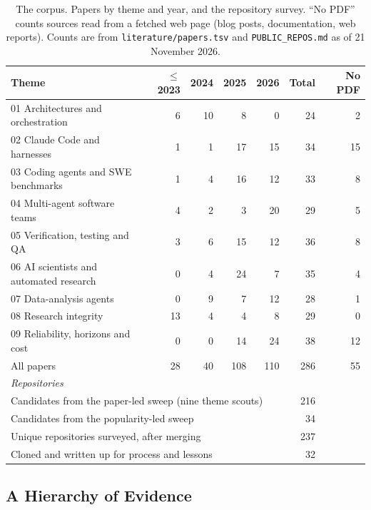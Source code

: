 \begin{table}[t]
\centering
\footnotesize
\setlength{\tabcolsep}{4pt}
\caption{The corpus. Papers by theme and year, and the repository survey. ``No PDF'' counts sources read from a fetched web page (blog posts, documentation, web reports). Counts are from \texttt{literature/papers.tsv} and \texttt{PUBLIC\_REPOS.md} as of 21 November 2026.}
\label{tab:corpus}
\begin{tabular}{lrrrrrr}
\toprule
Theme & $\leq$2023 & 2024 & 2025 & 2026 & Total & No PDF \\
\midrule
01 Architectures and orchestration & 6 & 10 & 8 & 0 & 24 & 2 \\
02 Claude Code and harnesses & 1 & 1 & 17 & 15 & 34 & 15 \\
03 Coding agents and SWE benchmarks & 1 & 4 & 16 & 12 & 33 & 8 \\
04 Multi-agent software teams & 4 & 2 & 3 & 20 & 29 & 5 \\
05 Verification, testing and QA & 3 & 6 & 15 & 12 & 36 & 8 \\
06 AI scientists and automated research & 0 & 4 & 24 & 7 & 35 & 4 \\
07 Data-analysis agents & 0 & 9 & 7 & 12 & 28 & 1 \\
08 Research integrity & 13 & 4 & 4 & 8 & 29 & 0 \\
09 Reliability, horizons and cost & 0 & 0 & 14 & 24 & 38 & 12 \\
\midrule
All papers & 28 & 40 & 108 & 110 & 286 & 55 \\
\midrule
\multicolumn{7}{l}{\textit{Repositories}} \\
\multicolumn{5}{l}{Candidates from the paper-led sweep (nine theme scouts)} & 216 & \\
\multicolumn{5}{l}{Candidates from the popularity-led sweep} & 34 & \\
\multicolumn{5}{l}{Unique repositories surveyed, after merging} & 237 & \\
\multicolumn{5}{l}{Cloned and written up for process and lessons} & 32 & \\
\bottomrule
\end{tabular}
\end{table}

\subsection{A Hierarchy of Evidence}

